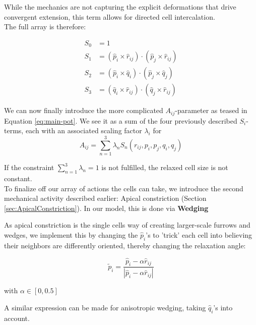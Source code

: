 While the mechanics are not capturing the explicit deformations that drive  convergent extension, this term allows for directed cell intercalation.\\

The full array is therefore:

\begin{subequations}
\begin{align}
S_0&=1\label{eq:s0}\\
S_1&=\left(\hat{p}_i \times \hat{r}_{i j}\right) \cdot\left(\hat{p}_j \times \hat{r}_{i j}\right)\label{eq:s1}\\
S_2&=\left(\hat{p}_i \times \hat{q}_{i}\right) \cdot\left(\hat{p}_j \times \hat{q}_{j}\right)\label{eq:s2}\\
S_3&=\left(\hat{q}_i \times \hat{r}_{i j}\right) \cdot\left(\hat{q}_j \times \hat{r}_{i j}\right)\label{eq:s3}
\end{align}
\end{subequations}


We can now finally introduce the more complicated $A_{ij}$-parameter as teased in Equation \ref{eq:main-pot}. We see it as a sum of the four previously described $S_i$-terms, each with an associated scaling factor $\lambda_i$ for  
\begin{equation}
    A_{ij}=\sum_{n=1}^{3}\lambda_n  S_n(r_{ij}, p_i, p_j, q_i, q_j)
\end{equation}


If the constraint $\sum_{n=1}^{3}\lambda_n=1$ is not fulfilled, the relaxed cell size is not constant. \\

To finalize off our array of actions the cells can take, we introduce the second mechanical activity described earlier: Apical constriction (Section \ref{sec:ApicalConstriction}). In our model, this is done via \textbf{Wedging}

As apical constriction is the single cells way of creating larger-scale furrows and wedges, we implement this by changing the $\hat{p}_i$'s to 'trick' each cell into believing their neighbors are differently oriented, thereby changing the relaxation angle:

\begin{equation}
    \tilde{{p}}_i = \frac{\hat{p}_i-\alpha \widehat{{r}}_{i j}}{|\hat{p}_i-\alpha \widehat{{r}}_{i j}|} 
\end{equation}

with $\alpha\in [0,0.5]$ 

A similar expression can be made for anisotropic wedging, taking  $\hat{q}_i$'s into account.\\

